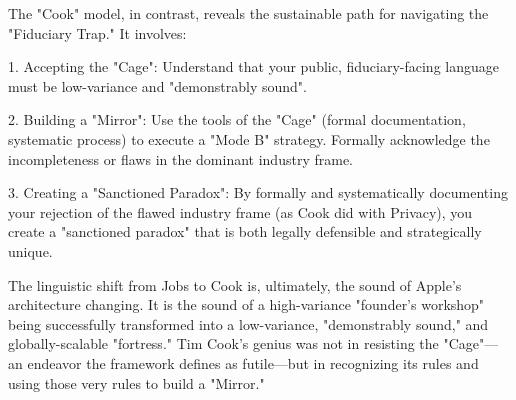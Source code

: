 \documentclass[12pt]{article}
\begin{document}
The "Cook" model, in contrast, reveals the sustainable path for navigating the "Fiduciary Trap." It involves:

1. Accepting the "Cage": Understand that your public, fiduciary-facing language must be low-variance and "demonstrably sound".

2. Building a "Mirror": Use the tools of the "Cage" (formal documentation, systematic process) to execute a "Mode B" strategy. Formally acknowledge the incompleteness or flaws in the dominant industry frame.

3. Creating a "Sanctioned Paradox": By formally and systematically documenting your rejection of the flawed industry frame (as Cook did with Privacy), you create a "sanctioned paradox" that is both legally defensible and strategically unique.

The linguistic shift from Jobs to Cook is, ultimately, the sound of Apple's architecture changing. It is the sound of a high-variance "founder's workshop" being successfully transformed into a low-variance, "demonstrably sound," and globally-scalable "fortress." Tim Cook's genius was not in resisting the "Cage"—an endeavor the framework defines as futile—but in recognizing its rules and using those very rules to build a "Mirror."



\end{document}
